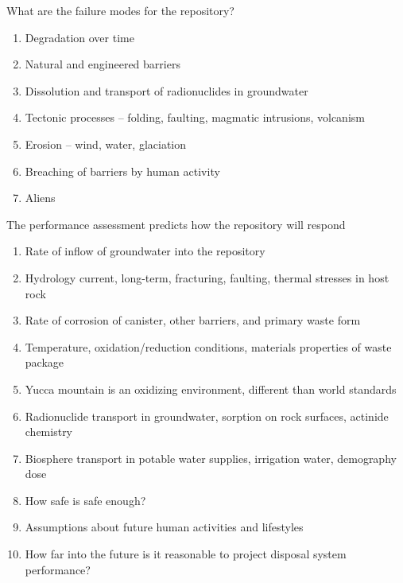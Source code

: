 \documentclass[aspectratio=1610,pdftex,dvipsnames,compress,xcolor={dvipsnames}]{beamer}
\begin{document}
\begin{frame}{What are the failure modes for the repository?}
    \begin{enumerate}[series=outerlist,topsep=0pt,itemsep=21pt,leftmargin=*,label=(\arabic*)]
        \item[]Degradation over time
        \item[]Natural and engineered barriers
        \item[]Dissolution and transport of radionuclides in groundwater
        \item[]Tectonic processes -- folding, faulting, magmatic intrusions, volcanism
        \item[]Erosion -- wind, water, glaciation
        \item[]Breaching of barriers by human activity
        \item[]Aliens
    \end{enumerate}
\end{frame}


\begin{frame}{The performance assessment predicts how the repository will respond}
    \begin{enumerate}[series=outerlist,topsep=0pt,itemsep=11pt,leftmargin=*,label=(\arabic*)]
        \item[]Rate of inflow of groundwater into the repository
        \item[]Hydrology current, long-term, fracturing, faulting, thermal stresses in host rock
        \item[]Rate of corrosion of canister, other barriers, and primary waste form
        \item[]Temperature, oxidation/reduction conditions, materials properties of waste package
        \item[]Yucca mountain is an oxidizing environment, different than world standards
        \item[]Radionuclide transport in groundwater, sorption on rock surfaces, actinide chemistry
        \item[]Biosphere transport in potable water supplies, irrigation water, demography dose 
        \item[]How safe is safe enough?
        \item[]Assumptions about future human activities and lifestyles
        \item[]How far into the future is it reasonable to project disposal system performance?
    \end{enumerate}
\end{frame}
\end{document}
